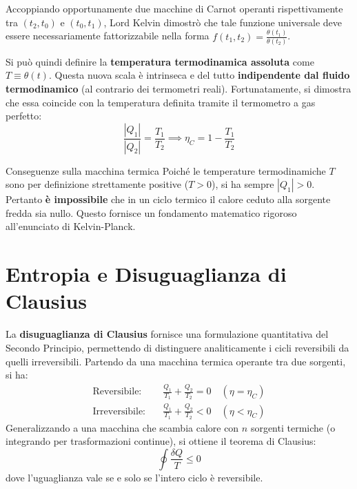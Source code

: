 Accoppiando opportunamente due macchine di Carnot operanti rispettivamente tra $(t_2, t_0)$ e $(t_0, t_1)$, Lord Kelvin dimostrò che tale funzione universale deve essere necessariamente fattorizzabile nella forma $f(t_1, t_2) = \frac{\theta(t_1)}{\theta(t_2)}$.

Si può quindi definire la \textbf{temperatura termodinamica assoluta} come $T \equiv \theta(t)$. Questa nuova scala è intrinseca e del tutto \textbf{indipendente dal fluido termodinamico} (al contrario dei termometri reali). Fortunatamente, si dimostra che essa coincide con la temperatura definita tramite il termometro a gas perfetto:
\begin{equation}
    \boxed{\frac{|Q_1|}{|Q_2|} = \frac{T_1}{T_2}} \implies \eta_C = 1 - \frac{T_1}{T_2}
\end{equation}

\begin{osservazione}{Conseguenze sulla macchina termica}
Poiché le temperature termodinamiche $T$ sono per definizione strettamente positive ($T > 0$), si ha sempre $|Q_1| > 0$. Pertanto \textbf{è impossibile} che in un ciclo termico il calore ceduto alla sorgente fredda sia nullo. Questo fornisce un fondamento matematico rigoroso all'enunciato di Kelvin-Planck.
\end{osservazione}
\section{Entropia e Disuguaglianza di Clausius}

La \textbf{disuguaglianza di Clausius} fornisce una formulazione quantitativa del Secondo Principio, permettendo di distinguere analiticamente i cicli reversibili da quelli irreversibili.
Partendo da una macchina termica operante tra due sorgenti, si ha:
\begin{align}
    \text{Reversibile:} &\quad \frac{Q_1}{T_1} + \frac{Q_2}{T_2} = 0 \quad (\eta = \eta_C) \\
    \text{Irreversibile:} &\quad \frac{Q_1}{T_1} + \frac{Q_2}{T_2} < 0 \quad (\eta < \eta_C)
\end{align}
Generalizzando a una macchina che scambia calore con $n$ sorgenti termiche (o integrando per trasformazioni continue), si ottiene il teorema di Clausius:
\begin{equation}
    \boxed{\oint \frac{\delta Q}{T} \le 0}
\end{equation}
dove l'uguaglianza vale se e solo se l'intero ciclo è reversibile.

